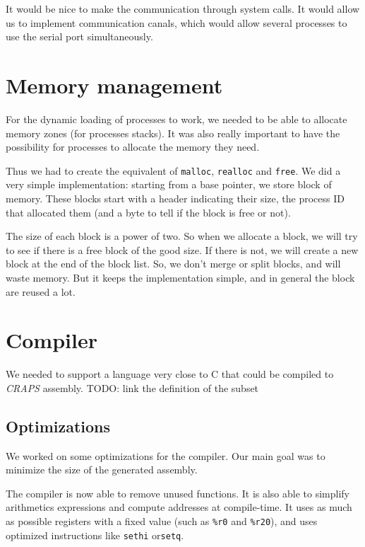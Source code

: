 \documentclass[openany, a4paper]{book}
\begin{document}
        It would be nice to make the communication through system calls. It
        would allow us to implement communication canals, which would allow
        several processes to use the serial port simultaneously.

    \section{Memory management}
      For the dynamic loading of processes to work, we needed to be able to
      allocate memory zones (for processes stacks). It was also really important
      to have the possibility for processes to allocate the memory they need.

      Thus we had to create the equivalent of \verb+malloc+, \verb+realloc+ and
      \verb+free+. We did a very
      simple implementation: starting from a base pointer, we store block of
      memory. These blocks start with a header indicating their size, the
      process ID that allocated them (and a byte to tell if the block is free or
      not).

      The size of each block is a power of two. So when we allocate a block, we
      will try to see if there is a free block of the good size. If there is
      not, we will create a new block at the end of the block list.
      So, we don't merge or split blocks, and will waste memory. But it keeps
      the implementation simple, and in general the block are reused a lot.

    \section{Compiler}
      We needed to support a language very close to C that could be compiled to
      \emph{CRAPS} assembly.
      TODO: link the definition of the subset

      \subsection{Optimizations}
      We worked on some optimizations for the compiler. Our main goal was to
      minimize the size of the generated assembly.

      The compiler is now able to remove unused functions. It is also able to
      simplify arithmetics expressions and compute addresses at compile-time.
      It uses as much as possible registers with a fixed value (such as
      \verb+%r0+ and \verb+%r20+), and uses optimized instructions like
      \verb+sethi+ or\verb+setq+.
\end{document}
